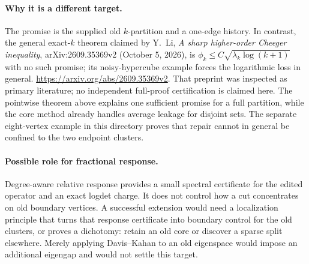 \documentclass[11pt]{article}
\begin{document}
\paragraph{Why it is a different target.}
The promise is the supplied old $k$-partition and a one-edge history.
In contrast, the general exact-$k$ theorem claimed by Y.~Li,
\emph{A sharp higher-order Cheeger inequality}, arXiv:2609.35369v2
(October 5, 2026), is
$\phi_k\le C\sqrt{\lambda_k\log(k+1)}$ with no such promise;
its noisy-hypercube example forces the logarithmic loss in general.
\url{https://arxiv.org/abs/2609.35369v2}.
That preprint was inspected as primary literature; no independent
full-proof certification is claimed here. The pointwise theorem above
explains one sufficient promise for a full partition, while the core
method already handles average leakage for disjoint sets. The separate
eight-vertex example in this directory proves that repair cannot in
general be confined to the two endpoint clusters.

\paragraph{Possible role for fractional response.}
Degree-aware relative response provides a small spectral certificate
for the edited operator and an exact logdet charge. It does not control
how a cut concentrates on old boundary vertices. A successful extension
would need a localization principle that turns that response certificate
into boundary control for the old clusters, or proves a dichotomy:
retain an old core or discover a sparse split elsewhere. Merely applying
Davis--Kahan to an old eigenspace would impose an additional eigengap
and would not settle this target.
\end{document}
